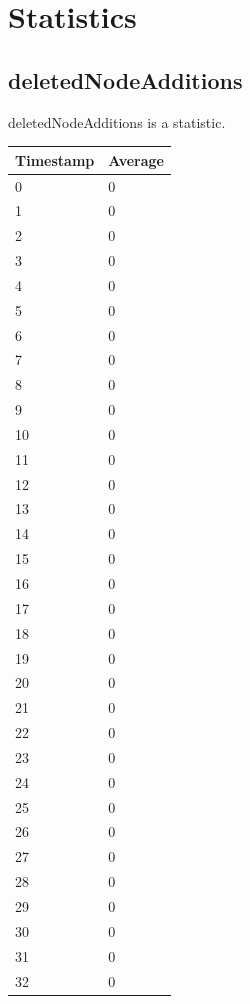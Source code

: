%
%
\section{Statistics}

\subsection{deletedNodeAdditions}
deletedNodeAdditions is a statistic.

%
%
\begin{tabular}{|l||l|}
\hline
	\textbf{Timestamp} & \textbf{Average} \\ \hline
	0 & 0 \\ \hline
	1 & 0 \\ \hline
	2 & 0 \\ \hline
	3 & 0 \\ \hline
	4 & 0 \\ \hline
	5 & 0 \\ \hline
	6 & 0 \\ \hline
	7 & 0 \\ \hline
	8 & 0 \\ \hline
	9 & 0 \\ \hline
	10 & 0 \\ \hline
	11 & 0 \\ \hline
	12 & 0 \\ \hline
	13 & 0 \\ \hline
	14 & 0 \\ \hline
	15 & 0 \\ \hline
	16 & 0 \\ \hline
	17 & 0 \\ \hline
	18 & 0 \\ \hline
	19 & 0 \\ \hline
	20 & 0 \\ \hline
	21 & 0 \\ \hline
	22 & 0 \\ \hline
	23 & 0 \\ \hline
	24 & 0 \\ \hline
	25 & 0 \\ \hline
	26 & 0 \\ \hline
	27 & 0 \\ \hline
	28 & 0 \\ \hline
	29 & 0 \\ \hline
	30 & 0 \\ \hline
	31 & 0 \\ \hline
	32 & 0 \\ \hline

\end{tabular}
